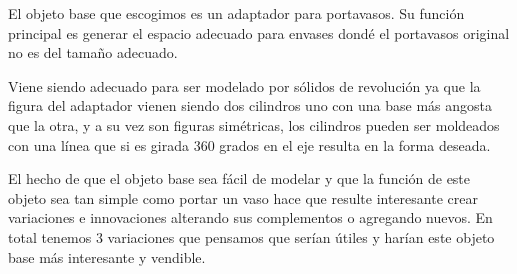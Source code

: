 \tab El objeto base que escogimos es un adaptador para portavasos. Su función principal es generar el espacio adecuado para envases dondé el portavasos original no es del tamaño adecuado.

\tab Viene siendo adecuado para ser modelado por sólidos de revolución ya que la figura del adaptador vienen siendo dos cilindros uno con una base más angosta que la otra, y a su vez son figuras simétricas, los cilindros pueden ser moldeados con una línea que si es girada 360 grados en el eje resulta en la forma deseada.

\tab El hecho de que el objeto base sea fácil de modelar y que la función de este objeto sea tan simple como portar un vaso hace que resulte interesante crear variaciones e innovaciones alterando sus complementos o agregando nuevos. En total tenemos 3 variaciones que pensamos que serían útiles y harían este objeto base más interesante y vendible.
